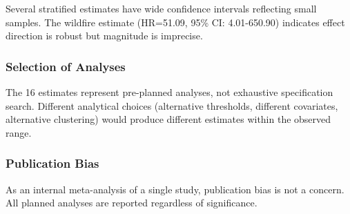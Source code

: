 \documentclass[
  12pt,
  letterpaper,
]{article}
\begin{document}
Several stratified estimates have wide confidence intervals reflecting
small samples. The wildfire estimate (HR=51.09, 95\% CI: 4.01-650.90)
indicates effect direction is robust but magnitude is imprecise.

\subsubsection{Selection of Analyses}\label{selection-of-analyses}

The 16 estimates represent pre-planned analyses, not exhaustive
specification search. Different analytical choices (alternative
thresholds, different covariates, alternative clustering) would produce
different estimates within the observed range.

\subsubsection{Publication Bias}\label{publication-bias}

As an internal meta-analysis of a single study, publication bias is not
a concern. All planned analyses are reported regardless of significance.
\end{document}
